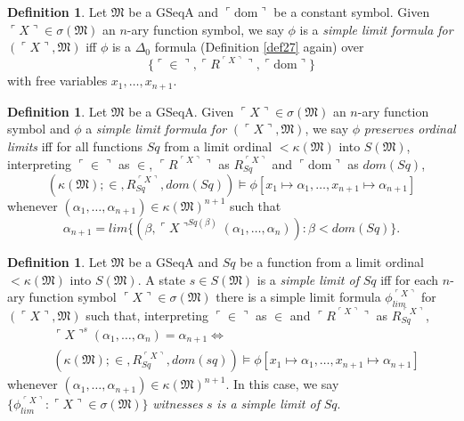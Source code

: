 \documentclass[12pt, twoside]{memoir}
\numberwithin{equation}{section}
\theoremstyle{definition}
\newtheorem{defi}[thm]{Definition}
\theoremstyle{remark}
\theoremstyle{definition}
\theoremstyle{definition}
\theoremstyle{definition}
\theoremstyle{remark}
\begin{document}
\begin{defi}
Let $\mathfrak{M}$ be a GSeqA and $\ulcorner \mathrm{dom} \urcorner$ be a constant symbol. Given $\ulcorner X \urcorner \in \sigma(\mathfrak{M})$ an $n$-ary function symbol, we say $\phi$ is a \emph{simple limit formula for} $(\ulcorner X \urcorner, \mathfrak{M})$ iff $\phi$ is a $\Delta_0$ formula (Definition \ref{def27} again) over $$\{\ulcorner \in \urcorner, \ulcorner R^{\ulcorner X \urcorner} \urcorner, \ulcorner \mathrm{dom} \urcorner\}$$ with free variables $x_1, \dots, x_{n+1}$.
\end{defi}

\begin{defi}\label{def234c}
Let $\mathfrak{M}$ be a GSeqA. Given $\ulcorner X \urcorner \in \sigma(\mathfrak{M})$ an $n$-ary function symbol and $\phi$ a \emph{simple limit formula for} $(\ulcorner X \urcorner, \mathfrak{M})$, we say $\phi$ \emph{preserves ordinal limits} iff for all functions $Sq$ from a limit ordinal $< \kappa(\mathfrak{M})$ into $S(\mathfrak{M})$, interpreting $\ulcorner \in \urcorner$ as $\in$, $\ulcorner R^{\ulcorner X \urcorner} \urcorner$ as $R_{Sq}^{\ulcorner X \urcorner}$ and $\ulcorner \mathrm{dom} \urcorner$ as $dom(Sq)$, 
\begin{equation*}
    (\kappa(\mathfrak{M}); \in, R_{Sq}^{\ulcorner X \urcorner}, dom(Sq)) \models \phi[x_1 \mapsto \alpha_1, \dots, x_{n+1} \mapsto \alpha_{n+1}]
\end{equation*}
whenever $(\alpha_1, \dots, \alpha_{n+1}) \in \kappa(\mathfrak{M})^{n+1}$ such that 
\begin{equation*}
    \alpha_{n+1} = lim \{(\beta, \ulcorner X \urcorner^{Sq(\beta)}(\alpha_1, \dots, \alpha_n)) : \beta < dom(Sq)\} \text{.}
\end{equation*}
\end{defi}

\begin{defi}\label{def234}
Let $\mathfrak{M}$ be a GSeqA and $Sq$ be a function from a limit ordinal $< \kappa(\mathfrak{M})$ into $S(\mathfrak{M})$. A state $s \in S(\mathfrak{M})$ is a \emph{simple limit of} $Sq$ iff for each $n$-ary function symbol $\ulcorner X \urcorner \in \sigma(\mathfrak{M})$ there is a simple limit formula $\phi_{lim}^{\ulcorner X \urcorner}$ for $(\ulcorner X \urcorner, \mathfrak{M})$ such that, interpreting $\ulcorner \in \urcorner$ as $\in$ and $\ulcorner R^{\ulcorner X \urcorner} \urcorner$ as $R_{Sq}^{\ulcorner X \urcorner}$, 
\begin{align*}
    & \ulcorner X \urcorner^s (\alpha_1, \dots, \alpha_n) = \alpha_{n+1} \iff \\
    & (\kappa(\mathfrak{M}); \in, R_{Sq}^{\ulcorner X \urcorner}, dom(sq)) \models \phi[x_1 \mapsto \alpha_1, \dots, x_{n+1} \mapsto \alpha_{n+1}]
\end{align*}
whenever $(\alpha_1, \dots, \alpha_{n+1}) \in \kappa(\mathfrak{M})^{n+1}$. In this case, we say $\{\phi_{lim}^{\ulcorner X \urcorner} : \ulcorner X \urcorner \in \sigma(\mathfrak{M})\}$ \emph{witnesses} $s$ \emph{is a simple limit of} $Sq$.
\end{defi}
\end{document}
